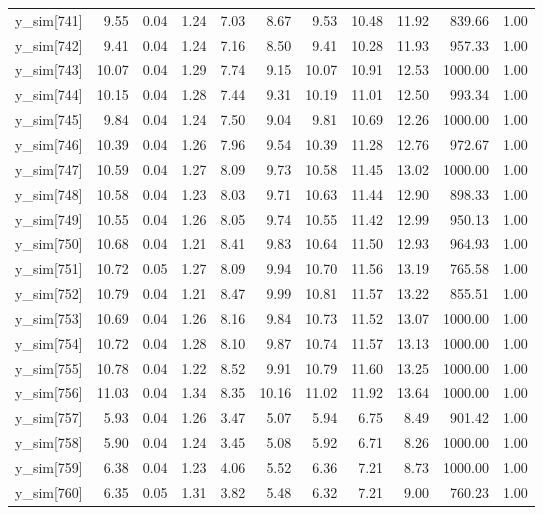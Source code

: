 \begin{table}[ht]
\begin{tabular}{rrrrrrrrrrr}
  y\_sim[741] & 9.55 & 0.04 & 1.24 & 7.03 & 8.67 & 9.53 & 10.48 & 11.92 & 839.66 & 1.00 \\ 
  y\_sim[742] & 9.41 & 0.04 & 1.24 & 7.16 & 8.50 & 9.41 & 10.28 & 11.93 & 957.33 & 1.00 \\ 
  y\_sim[743] & 10.07 & 0.04 & 1.29 & 7.74 & 9.15 & 10.07 & 10.91 & 12.53 & 1000.00 & 1.00 \\ 
  y\_sim[744] & 10.15 & 0.04 & 1.28 & 7.44 & 9.31 & 10.19 & 11.01 & 12.50 & 993.34 & 1.00 \\ 
  y\_sim[745] & 9.84 & 0.04 & 1.24 & 7.50 & 9.04 & 9.81 & 10.69 & 12.26 & 1000.00 & 1.00 \\ 
  y\_sim[746] & 10.39 & 0.04 & 1.26 & 7.96 & 9.54 & 10.39 & 11.28 & 12.76 & 972.67 & 1.00 \\ 
  y\_sim[747] & 10.59 & 0.04 & 1.27 & 8.09 & 9.73 & 10.58 & 11.45 & 13.02 & 1000.00 & 1.00 \\ 
  y\_sim[748] & 10.58 & 0.04 & 1.23 & 8.03 & 9.71 & 10.63 & 11.44 & 12.90 & 898.33 & 1.00 \\ 
  y\_sim[749] & 10.55 & 0.04 & 1.26 & 8.05 & 9.74 & 10.55 & 11.42 & 12.99 & 950.13 & 1.00 \\ 
  y\_sim[750] & 10.68 & 0.04 & 1.21 & 8.41 & 9.83 & 10.64 & 11.50 & 12.93 & 964.93 & 1.00 \\ 
  y\_sim[751] & 10.72 & 0.05 & 1.27 & 8.09 & 9.94 & 10.70 & 11.56 & 13.19 & 765.58 & 1.00 \\ 
  y\_sim[752] & 10.79 & 0.04 & 1.21 & 8.47 & 9.99 & 10.81 & 11.57 & 13.22 & 855.51 & 1.00 \\ 
  y\_sim[753] & 10.69 & 0.04 & 1.26 & 8.16 & 9.84 & 10.73 & 11.52 & 13.07 & 1000.00 & 1.00 \\ 
  y\_sim[754] & 10.72 & 0.04 & 1.28 & 8.10 & 9.87 & 10.74 & 11.57 & 13.13 & 1000.00 & 1.00 \\ 
  y\_sim[755] & 10.78 & 0.04 & 1.22 & 8.52 & 9.91 & 10.79 & 11.60 & 13.25 & 1000.00 & 1.00 \\ 
  y\_sim[756] & 11.03 & 0.04 & 1.34 & 8.35 & 10.16 & 11.02 & 11.92 & 13.64 & 1000.00 & 1.00 \\ 
  y\_sim[757] & 5.93 & 0.04 & 1.26 & 3.47 & 5.07 & 5.94 & 6.75 & 8.49 & 901.42 & 1.00 \\ 
  y\_sim[758] & 5.90 & 0.04 & 1.24 & 3.45 & 5.08 & 5.92 & 6.71 & 8.26 & 1000.00 & 1.00 \\ 
  y\_sim[759] & 6.38 & 0.04 & 1.23 & 4.06 & 5.52 & 6.36 & 7.21 & 8.73 & 1000.00 & 1.00 \\ 
  y\_sim[760] & 6.35 & 0.05 & 1.31 & 3.82 & 5.48 & 6.32 & 7.21 & 9.00 & 760.23 & 1.00 \\ 

\end{tabular}
\end{table}
